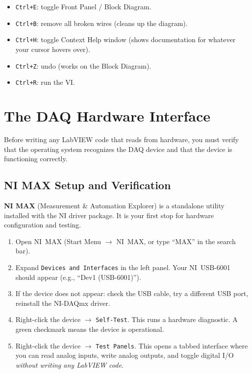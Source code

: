 \begin{tipbox}
\begin{itemize}[nosep,leftmargin=1.5em]
\item \texttt{Ctrl+E}: toggle Front Panel / Block Diagram.
\item \texttt{Ctrl+B}: remove all broken wires (cleans up the diagram).
\item \texttt{Ctrl+H}: toggle Context Help window (shows documentation for whatever your cursor hovers over).
\item \texttt{Ctrl+Z}: undo (works on the Block Diagram).
\item \texttt{Ctrl+R}: run the VI.
\end{itemize}
\end{tipbox}

\section{The DAQ Hardware Interface}
\label{sec:lv_daq_hw}

Before writing any LabVIEW code that reads from hardware, you must verify that the operating system recognizes the DAQ device and that the device is functioning correctly.

\subsection{NI MAX Setup and Verification}

\textbf{NI MAX} (Measurement \& Automation Explorer) is a standalone utility installed with the NI driver package. It is your first stop for hardware configuration and testing.

\begin{enumerate}[leftmargin=1.5em]
\item Open NI~MAX (Start Menu $\to$ NI~MAX, or type ``MAX'' in the search bar).
\item Expand \texttt{Devices and Interfaces} in the left panel. Your NI~USB-6001 should appear (e.g., ``Dev1 (USB-6001)'').
\item If the device does not appear: check the USB cable, try a different USB port, reinstall the NI-DAQmx driver.
\item Right-click the device $\to$ \texttt{Self-Test}. This runs a hardware diagnostic. A green checkmark means the device is operational.
\item Right-click the device $\to$ \texttt{Test Panels}. This opens a tabbed interface where you can read analog inputs, write analog outputs, and toggle digital I/O \emph{without writing any LabVIEW code}.
\end{enumerate}

